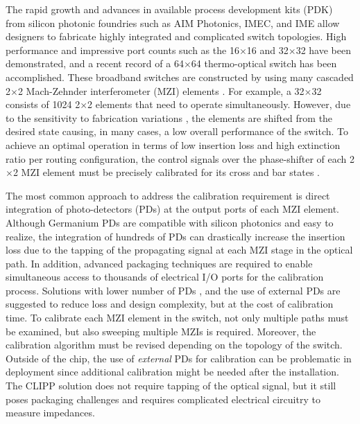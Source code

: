The rapid growth and advances in available process development kits (PDK) from silicon photonic foundries \cite{Lim_SIPIntegration} such  as AIM Photonics, IMEC, and IME allow designers to fabricate highly integrated and complicated switch topologies. High performance and impressive port counts such as the 16$\times$16\cite{Lu_16} and 32$\times$32\cite{Lei_32,Celo_HighRadixSwitch_2} have been demonstrated, and a recent record of a 64$\times$64\cite{Chu_64} thermo-optical switch has been accomplished. These broadband switches are constructed by using many cascaded 2$\times$2 Mach-Zehnder interferometer (MZI) elements \cite{dupuis2018impact, cheng2017advanced}. For example, a 32$\times$32 consists of 1024 2$\times$2 elements \cite{Tanizawa_HighRadixSwitch_3} that need to operate simultaneously. However, due to the sensitivity to fabrication variations \cite{Selvaraja_fabircation}, the elements are shifted from the desired state causing, in many cases, a low overall performance of the switch. To achieve an optimal operation in terms of low insertion loss and high extinction ratio per routing configuration, the control signals over the phase-shifter of each 2$\times$2 MZI element must be precisely calibrated for its cross and bar states \cite{Qixiang_smart_routing, huang2018crosstalk}. 

The most common approach to address the calibration requirement is direct integration of photo-detectors (PDs) at the output ports of each MZI element. Although Germanium PDs are compatible with silicon photonics and easy to realize, the integration of hundreds of PDs \cite{Dumais_900PDs} can drastically increase the insertion loss due to the tapping of the propagating signal at each MZI stage in the optical path. In addition, advanced packaging techniques are required to enable simultaneous access to thousands of electrical I/O ports for the calibration process. Solutions with lower number of PDs \cite{Lei_32}, and the use of external PDs \cite{Hung_noPDs} are suggested to reduce loss and design complexity, but at the cost of calibration time. To calibrate each MZI element in the switch, not only multiple paths must be examined, but also sweeping multiple MZIs is required. Moreover, the calibration algorithm must be revised depending on the topology of the switch. Outside of the chip, the use of \textit{external} PDs for calibration can be problematic in deployment since additional calibration might be needed after the installation. The CLIPP \cite{Morichetti_CLIPP} solution does not require tapping of the optical signal, but it still poses packaging challenges and requires complicated electrical circuitry to measure impedances. 

